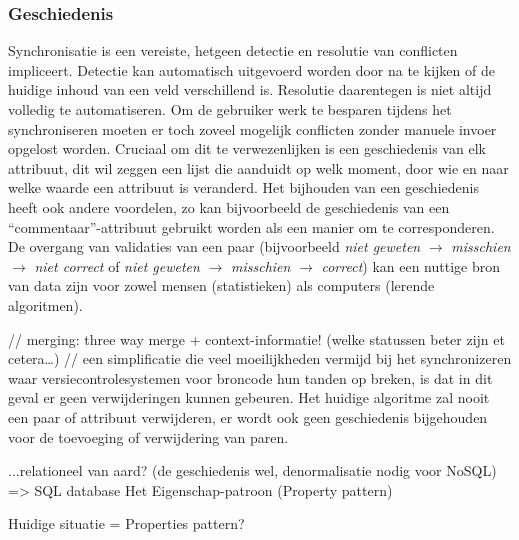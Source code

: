 \subsubsection{Geschiedenis}
Synchronisatie is een vereiste, hetgeen detectie en resolutie van conflicten impliceert. Detectie kan automatisch uitgevoerd worden door na te kijken of de huidige inhoud van een veld verschillend is. Resolutie daarentegen is niet altijd volledig te automatiseren. Om de gebruiker werk te besparen tijdens het synchroniseren moeten er toch zoveel mogelijk conflicten zonder manuele invoer opgelost worden. Cruciaal om dit te verwezenlijken is een geschiedenis van elk attribuut, dit wil zeggen een lijst die aanduidt op welk moment, door wie en naar welke waarde een attribuut is veranderd. Het bijhouden van een geschiedenis heeft ook andere voordelen, zo kan bijvoorbeeld de geschiedenis van een ``commentaar''-attribuut gebruikt worden als een manier om te corresponderen. De overgang van validaties van een paar (bijvoorbeeld \emph{niet geweten} $\rightarrow$ \emph{misschien} $\rightarrow$ \emph{niet correct} of  \emph{niet geweten} $\rightarrow$ \emph{misschien} $\rightarrow$ \emph{correct}) kan een nuttige bron van data zijn voor zowel mensen (statistieken) als computers (lerende algoritmen).

// merging: three way merge + context-informatie! (welke statussen beter zijn et cetera\ldots)
// een simplificatie die veel moeilijkheden vermijd bij het synchronizeren waar versiecontrolesystemen voor broncode hun tanden op breken, is dat in dit geval er geen verwijderingen kunnen gebeuren. Het huidige algoritme zal nooit een paar of attribuut verwijderen, er wordt ook geen geschiedenis bijgehouden voor de toevoeging of verwijdering van paren.

  
...relationeel van aard? (de geschiedenis wel, denormalisatie nodig voor NoSQL) => SQL database
Het Eigenschap-patroon (Property pattern)

Huidige situatie = Properties pattern? %

